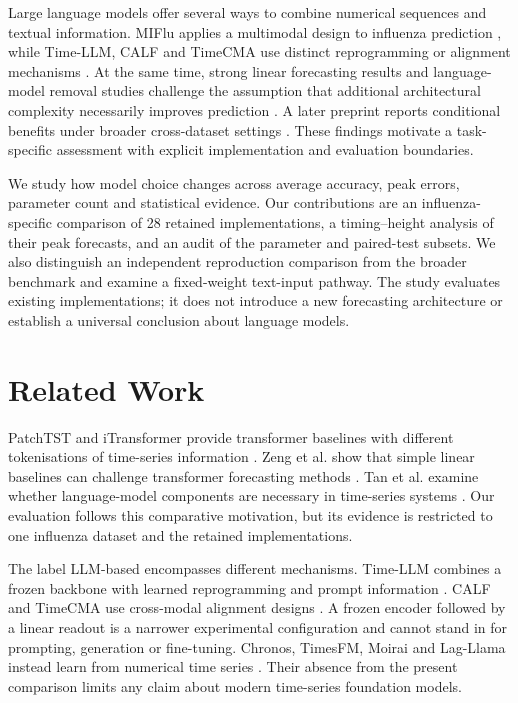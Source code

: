 \documentclass[journal,twoside,print]{ieeecolor}
\begin{document}
Large language models offer several ways to combine numerical sequences and textual information. MIFlu applies a multimodal design to influenza prediction \cite{r1}, while Time-LLM, CALF and TimeCMA use distinct reprogramming or alignment mechanisms \cite{r6,r7,r8}. At the same time, strong linear forecasting results and language-model removal studies challenge the assumption that additional architectural complexity necessarily improves prediction \cite{r4,r13}. A later preprint reports conditional benefits under broader cross-dataset settings \cite{r14}. These findings motivate a task-specific assessment with explicit implementation and evaluation boundaries.

We study how model choice changes across average accuracy, peak errors, parameter count and statistical evidence. Our contributions are an influenza-specific comparison of 28 retained implementations, a timing--height analysis of their peak forecasts, and an audit of the parameter and paired-test subsets. We also distinguish an independent reproduction comparison from the broader benchmark and examine a fixed-weight text-input pathway. The study evaluates existing implementations; it does not introduce a new forecasting architecture or establish a universal conclusion about language models.

\section{Related Work}
PatchTST and iTransformer provide transformer baselines with different tokenisations of time-series information \cite{r3,r5}. Zeng et al. show that simple linear baselines can challenge transformer forecasting methods \cite{r4}. Tan et al. examine whether language-model components are necessary in time-series systems \cite{r13}. Our evaluation follows this comparative motivation, but its evidence is restricted to one influenza dataset and the retained implementations.

The label LLM-based encompasses different mechanisms. Time-LLM combines a frozen backbone with learned reprogramming and prompt information \cite{r6}. CALF and TimeCMA use cross-modal alignment designs \cite{r7,r8}. A frozen encoder followed by a linear readout is a narrower experimental configuration and cannot stand in for prompting, generation or fine-tuning. Chronos, TimesFM, Moirai and Lag-Llama instead learn from numerical time series \cite{r9,r10,r11,r12}. Their absence from the present comparison limits any claim about modern time-series foundation models.
\end{document}

